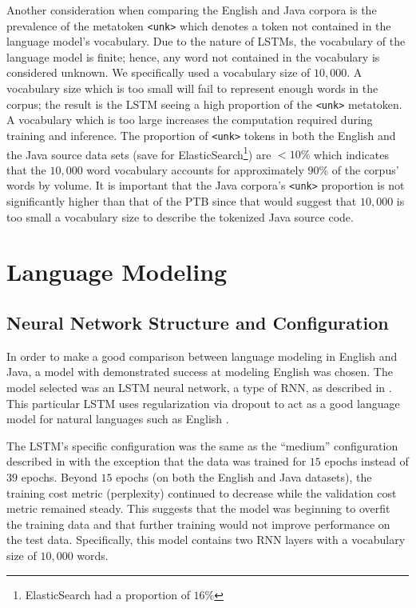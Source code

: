 \documentclass[runningheads,a4paper]{llncs}
\begin{document}
Another consideration when comparing the English and Java corpora is the
prevalence of the metatoken \texttt{<unk>} which denotes a token not contained
in the language model's vocabulary.
Due to the nature of LSTMs, the vocabulary of the language model is finite;
hence, any word not contained in the vocabulary is considered unknown.
We specifically used a vocabulary size of $10,000$. A vocabulary size which
is too small will fail to represent enough words in the corpus; the result
is the LSTM seeing a high proportion of the \texttt{<unk>} metatoken. A
vocabulary which is too large increases the computation required during
training and inference.
The proportion of \texttt{<unk>} tokens in both the English and the Java
source data sets (save for ElasticSearch\footnote{ElasticSearch had a
proportion of $16\%$}) are $<10\%$ which indicates that
the $10,000$ word vocabulary accounts for approximately $90\%$ of the corpus'
words by volume. It is important that the Java corpora's \texttt{<unk>}
proportion is not significantly higher than that of the PTB since
that would suggest that $10,000$ is too small a vocabulary size to describe
the tokenized Java source code.

\section{Language Modeling}
\label{language-modeling}

\subsection{Neural Network Structure and Configuration}

In order to make a good comparison between language modeling in English
and Java, a model with demonstrated success at modeling English was
chosen. The model selected was an LSTM neural
network, a type of RNN, as described in
\citet{LSTMArticle}. This particular LSTM uses regularization via 
dropout to act as a good language model for natural languages
such as English \cite{LSTMArticle}.


The LSTM's specific configuration was the same as the ``medium''
configuration described in \citet{LSTMArticle} with the exception
that the data was trained for $15$ epochs instead of $39$ epochs.
Beyond $15$ epochs (on both the English and Java datasets), the 
training cost metric (perplexity) continued to decrease while the
validation cost metric remained steady. This suggests that the model
was beginning to overfit the training data and that further training
would not improve performance on the test data.
Specifically, this model contains two RNN layers with a vocabulary
size of $10,000$ words.
\end{document}
